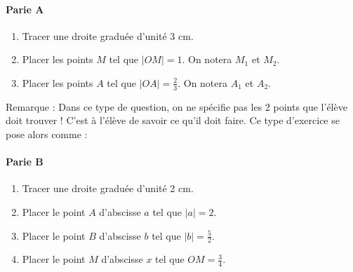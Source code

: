 
\paragraph{Parie A}

\begin{enumerate}
\item Tracer une droite graduée d'unité 3 cm.
\item Placer les points $M$ tel que $\vert OM \vert = 1$. On notera $M_1$ et $M_2$.
\item Placer les points $A$ tel que $\vert OA \vert = \frac{2}{3}$. On notera $A_1$ et $A_2$.
\end{enumerate}

Remarque : Dans ce type de question, on ne spécifie pas les 2 points que l'élève doit trouver ! C'est à l'élève de savoir ce qu'il doit faire. Ce type d'exercice se pose alors comme :

\paragraph{Parie B}

\begin{enumerate}
\item Tracer une droite graduée d'unité 2 cm.
\item Placer le point $A$ d'abscisse $a$ tel que $\vert a \vert = 2$.
\item Placer le point $B$ d'abscisse $b$ tel que $\vert b \vert = \frac{5}{2}$.
\item Placer le point $M$ d'abscisse $x$ tel que $OM = \frac{3}{4}$.
\end{enumerate}